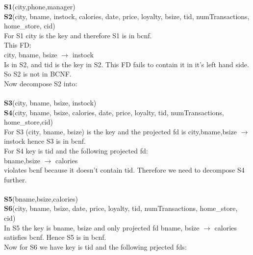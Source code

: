 \documentclass{article}
\begin{document}
\begin{enumerate}
	  \textbf{S1}(city,phone,manager)\\
	  \textbf{S2}(city, bname, instock, calories, date, price, loyalty, bsize, tid, numTransactions, home\_store, cid)\\
	  For S1 city is the key and therefore S1 is in bcnf.\\
	  This FD:\\
	  city, bname, bsize $\rightarrow$ instock\\
		  Is in S2, and tid is the key in S2. This FD fails to contain it in it's left hand side. So S2 is not in BCNF.\\
		  Now decompose S2 into: \\\\
	  \textbf{S3}(city, bname, bsize, instock)\\
	  \textbf{S4}(city, bname, bsize, calories, date, price, loyalty, tid, numTransactions, home\_store,cid)\\
	  For S3 (city, bname, bsize) is the key and the projected fd is city,bname,bsize $\rightarrow$ instock
	  hence S3 is in bcnf.\\
	  For S4 key is tid and the following projected fd:\\
		bname,bsize $\rightarrow$ calories\\
		violates bcnf because it doesn't contain tid. Therefore we need to decompose S4 further.\\\\
	  \textbf{S5}(bname,bsize,calories)\\
	  \textbf{S6}(city, bname, bsize, date, price, loyalty, tid, numTransactions, home\_store, cid)\\
	  In S5 the key is bname, bsize and only projected fd bname, bsize $\rightarrow$ calories satisfies bcnf. Hence
	  S5 is in bcnf.\\
	  Now for S6 we have key is tid and the following prjected fds:
		

\end{enumerate}
\end{document}

